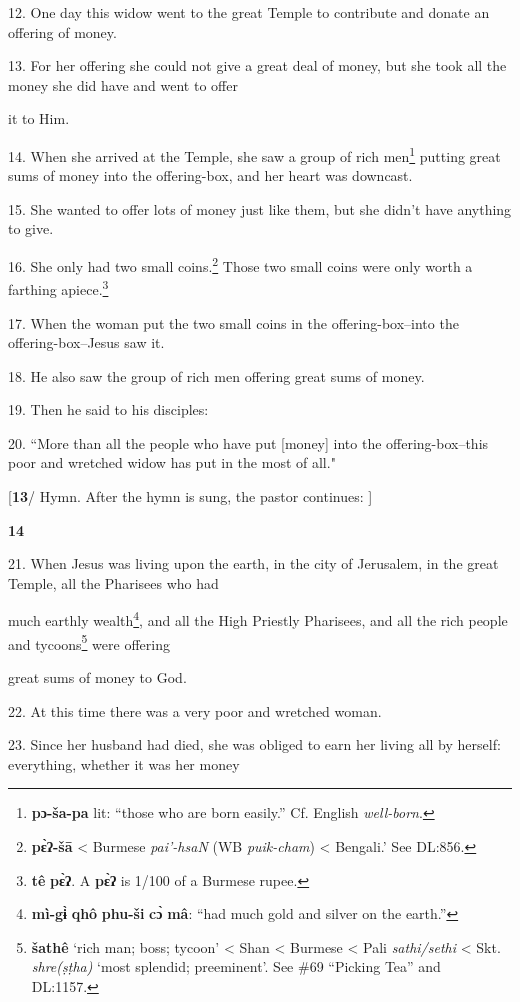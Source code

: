 12. One day this widow went to the great Temple to contribute and donate an offering
of money.

13. For her offering she could not give a great deal of money, but she took all
the money she did have and went to offer

it to Him.

14. When she arrived at the Temple, she saw a group of rich men\footnote{\textbf{pɔ-ša-pa} lit: ``those who are born easily.'' Cf. English \textit{well-born}.} putting great
sums of money into the offering-box, and her heart was downcast.

15. She wanted to offer lots of money just like them, but she didn't have anything
to give.

16. She only had two small coins.\footnote{\textbf{pɛ̀ʔ-šā} < Burmese \textit{pai'-hsaN} (WB \textit{puik-cham}) < Bengali.' See DL:856.} Those two small coins were only worth a farthing
apiece.\footnote{\textbf{tê} \textbf{pɛ̀ʔ}. A \textbf{pɛ̀ʔ} is 1/100 of a Burmese rupee.}

17. When the woman put the two small coins in the offering-box--into the offering-box--Jesus
saw it.

18. He also saw the group of rich men offering great sums of money.

19. Then he said to his disciples:

20. ``More than all the people who have put [money] into the offering-box--this
poor and wretched widow has put in the most of all."

[\textbf{13}/ Hymn. After the hymn is sung, the pastor continues: ]

\textbf{14}

21. When Jesus was living upon the earth, in the city of Jerusalem, in the great
Temple, all the Pharisees who had

much earthly wealth\footnote{\textbf{mì-gɨ̀} \textbf{qhô} \textbf{phu-ši} \textbf{cɔ̀} \textbf{mâ}: ``had much gold and silver on the earth.''}, and all the High Priestly Pharisees, and all the rich
people and tycoons\footnote{\textbf{šathê} `rich man; boss; tycoon' < Shan < Burmese < Pali \textit{sathi/sethi} < Skt. \textit{shre(ṣṭha)} `most splendid; preeminent'. See \#69 ``Picking Tea'' and DL:1157.} were offering

great sums of money to God.

22. At this time there was a very poor and wretched woman.

23. Since her husband had died, she was obliged to earn her living all by herself:
everything, whether it was her money


